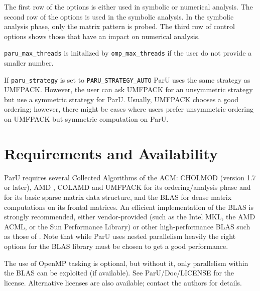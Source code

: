 \documentclass[12pt]{article}
\begin{document}
The first row of the options is either used in symbolic or numerical analysis.
The second row of the options is used in the symbolic analysis. In the symbolic 
analysis phase, only the matrix pattern is probed. 
The third row of control options shows those that have an impact on numerical 
analysis.

\verb'paru_max_threads' is initalized by \verb'omp_max_threads' if the user do 
not provide a smaller number.

If \verb'paru_strategy' is set to \verb'PARU_STRATEGY_AUTO' ParU uses the same 
strategy as UMFPACK. However, the user can ask UMFPACK for an unsymmetric 
strategy but use a symmetric strategy for ParU. Usually, UMFPACK chooses a good 
ordering; however, there might be cases where users prefer unsymmetric ordering on
UMFPACK but symmetric computation on ParU.
    
\section{Requirements and Availability}
\label{summary}

ParU requires several Collected Algorithms of the ACM: CHOLMOD
\cite{ChenDavisHagerRajamanickam09,DavisHager09} (version 1.7 or later), AMD
\cite{AmestoyDavisDuff96,AmestoyDavisDuff03}, COLAMD
\cite{DavisGilbertLarimoreNg00_algo,DavisGilbertLarimoreNg00} and UMFPACK 
\cite{10.1145/992200.992206} for its
ordering/analysis phase and for its basic sparse matrix data structure, and the
BLAS \cite{dddh:90} for dense matrix computations on its frontal matrices. 
An efficient implementation of the BLAS is strongly recommended, either
vendor-provided (such as the Intel MKL, the AMD ACML, or the 
Sun Performance Library) or other high-performance BLAS such as those of 
\cite{GotoVanDeGeijn08}. Note that while ParU uses nested parallelism heavily
the right options for the BLAS library must be chosen to get a good performance.

The use of OpenMP tasking is optional, but
without it, only parallelism within the BLAS can be exploited (if available).
See ParU/Doc/LICENSE for the license.
Alternative licenses are also
available; contact the authors for details.




\end{document}
